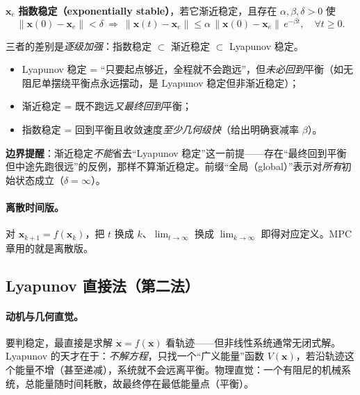 \begin{definition}[指数稳定]
\label{def:ctrl-exp-stable}
$\mathbf{x}_e$ \textbf{指数稳定（exponentially stable）}，若它渐近稳定，且存在 $\alpha,\beta,\delta>0$ 使
\begin{equation}
  \|\mathbf{x}(0)-\mathbf{x}_e\|<\delta\ \Rightarrow\ \|\mathbf{x}(t)-\mathbf{x}_e\|\le\alpha\,\|\mathbf{x}(0)-\mathbf{x}_e\|\,e^{-\beta t},\quad\forall t\ge0.
\end{equation}
\end{definition}

\begin{insight}
三者的差别是\emph{逐级加强}：指数稳定 $\subset$ 渐近稳定 $\subset$ Lyapunov 稳定。
\begin{itemize}
  \item Lyapunov 稳定 = “只要起点够近，全程就不会跑远”，但\emph{未必回到}平衡（如无阻尼单摆绕平衡点永远摆动，是 Lyapunov 稳定但非渐近稳定）；
  \item 渐近稳定 = 既不跑远\emph{又最终回到}平衡；
  \item 指数稳定 = 回到平衡且收敛速度\emph{至少几何级快}（给出明确衰减率 $\beta$）。
\end{itemize}
\textbf{边界提醒}：渐近稳定\emph{不能}省去“Lyapunov 稳定”这一前提——存在“最终回到平衡但中途先跑很远”的反例，那样不算渐近稳定。前缀“全局（global）”表示对\emph{所有}初始状态成立（$\delta=\infty$）。
\end{insight}

\paragraph{离散时间版。}
对 $\mathbf{x}_{k+1}=f(\mathbf{x}_k)$，把 $t$ 换成 $k$、$\lim_{t\to\infty}$ 换成 $\lim_{k\to\infty}$ 即得对应定义\cite{khalil2002nonlinear}。MPC 章用的就是离散版。

\subsection{Lyapunov 直接法（第二法）}
\label{sec:ctrl-lyap-direct}

\paragraph{动机与几何直觉。}
要判稳定，最直接是求解 $\dot{\mathbf{x}}=f(\mathbf{x})$ 看轨迹——但非线性系统通常无闭式解。Lyapunov 的天才在于：\emph{不解方程}，只找一个“广义能量”函数 $V(\mathbf{x})$，若沿轨迹这个能量不增（甚至递减），系统就不会远离平衡。物理直觉：一个有阻尼的机械系统，总能量随时间耗散，故最终停在最低能量点（平衡）。

